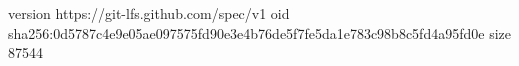 version https://git-lfs.github.com/spec/v1
oid sha256:0d5787c4e9e05ae097575fd90e3e4b76de5f7fe5da1e783c98b8c5fd4a95fd0e
size 87544
